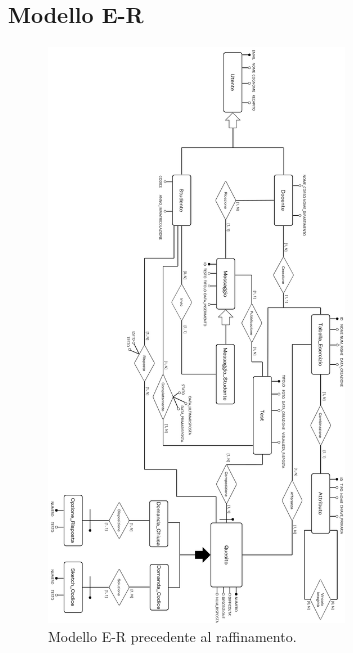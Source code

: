 \documentclass{article}
\begin{document}
\subsection{Modello E-R}
\begin{figure}[H]
    \includegraphics[width=0.7\textwidth]{foto1.png}
    \caption{Modello E-R precedente al raffinamento.}
\end{figure}
\end{document}
